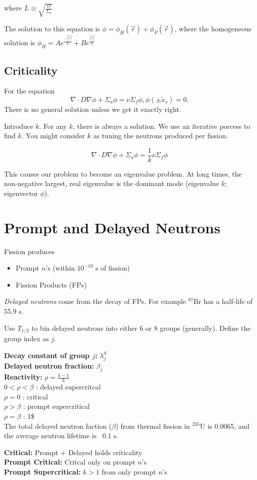 \documentclass{report}
\newcommand{\tab}{\-\hspace{1cm}}
\newcommand{\h}[1]{\section*{#1}}
\newcommand{\hh}[1]{\subsection*{#1}}
\newcommand{\Xs}{\Sigma}
\newcommand{\pos}{\vec{r}}
\newcommand{\halflife}{T_{1/2}}
\newcommand{\ufive}{^{235}\text{U}}
\begin{document}
where $L \equiv \sqrt{\frac{D}{\Xs_a}}$

The solution to this equation is $\phi = \phi_H(\pos) + \phi_P(\pos)$, where the homogeneous solution is $\phi_H = Ae^{\frac{-|\pos|}{L}} + Be^{\frac{|\pos|}{L}}$


\hh{Criticality}

For the equation
$$\nabla \cdot D \nabla \phi + \Xs_a \phi = \nu\Xs_f \phi, \phi(\pm\tilde{x}_s) = 0.$$
There is no general solution unless we get it exactly right.

Introduce $k$. For any $k$, there is always a solution. We use an iterative porcess to find $k$. You might consider $k$ as tuning the neutrons produced per fission.

$$\nabla \cdot D \nabla \phi + \Xs_a \phi = \frac{1}{k}\nu\Xs_f \phi$$

This causes our problem to become an eigenvalue problem. At long times, the non-negative largest, real eigenvalue is the dominant mode (eigenvalue $k$; eigenvector $\phi$).

\h{Prompt and Delayed Neutrons}

Fission produces
\begin{itemize}
    \item Prompt $n$'s (within $10^{-10}$ s of fission)
    \item Fission Products (FPs)
\end{itemize}

\textit{Delayed neutrons} come from the decay of FPs. For example $^{87}\text{Br}$ has a half-life of 55.9 s.

Use $\halflife$ to bin delayed neutrons into either 6 or 8 groups (generally). Define the group index as $j$.

\textbf{Decay constant of group $j$: } $\lambda_j^d$ \\
\textbf{Delayed neutron fraction: } $\beta_j$\\
\textbf{Reactivity: } $\rho = \frac{k-1}{k}$\\
    \tab $0<\rho<\beta$ : delayed supercritcal\\
    \tab $\rho=0$ : critical\\
    \tab $\rho>\beta$ : prompt supercritical\\
    \tab $\rho=\beta$ : 1\$\\

The total delayed neutron faction ($\beta$) from thermal fission in $\ufive$ is 0.0065, and the average neutron lifetime is ~0.1 s.

\textbf{Critical: } Prompt + Delayed holds criticality\\
\textbf{Prompt Critical:} Critcal only on prompt $n$'s\\
\textbf{Prompt Supercritical: } $k>1$ from only prompt $n$'s\\
\end{document}
